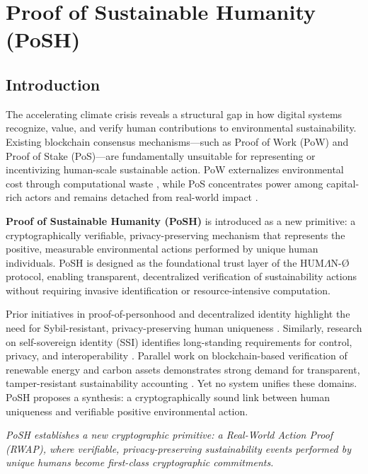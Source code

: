 \documentclass[11pt,a4paper]{report}
\theoremstyle{definition}
\theoremstyle{remark}
\begin{document}
\chapter{Proof of Sustainable Humanity (PoSH)}
\label{chap:posh}

\section{Introduction}

The accelerating climate crisis reveals a structural gap in how digital systems
recognize, value, and verify human contributions to environmental sustainability.
Existing blockchain consensus mechanisms---such as Proof of Work (PoW) and Proof
of Stake (PoS)---are fundamentally unsuitable for representing or incentivizing
human-scale sustainable action. PoW externalizes environmental cost through
computational waste \cite{goodell2020greenBlockchain}, while PoS concentrates power among capital-rich actors and
remains detached from real-world impact \cite{saleh2021pos}.

\textbf{Proof of Sustainable Humanity (PoSH)} is introduced as a new primitive:
a cryptographically verifiable, privacy-preserving mechanism that represents the
positive, measurable environmental actions performed by unique human individuals.
PoSH is designed as the foundational trust layer of the HUM{\Large$\Lambda$}N-Ø
protocol, enabling transparent, decentralized verification of sustainability
actions without requiring invasive identification or resource-intensive
computation.

Prior initiatives in proof-of-personhood and decentralized identity highlight
the need for Sybil-resistant, privacy-preserving human uniqueness
\cite{ohlhaver2025compressed,worldcoinWhitepaper,polkadot2025individuality}.
Similarly, research on self-sovereign identity (SSI) identifies long-standing
requirements for control, privacy, and interoperability
\cite{schardong2022ssiSurvey,pava2024ssiBlockchain}. Parallel work on
blockchain-based verification of renewable energy and carbon assets demonstrates
strong demand for transparent, tamper-resistant sustainability accounting
\cite{energy2024recTrading,fu2023recCommunity,infosys2025blockchainREC}.
Yet no system unifies these domains. PoSH proposes a synthesis: a
cryptographically sound link between human uniqueness and verifiable positive
environmental action.

\medskip
\noindent\textit{PoSH establishes a new cryptographic primitive: a Real-World
Action Proof (RWAP), where verifiable, privacy-preserving sustainability events
performed by unique humans become first-class cryptographic commitments.}
\end{document}
